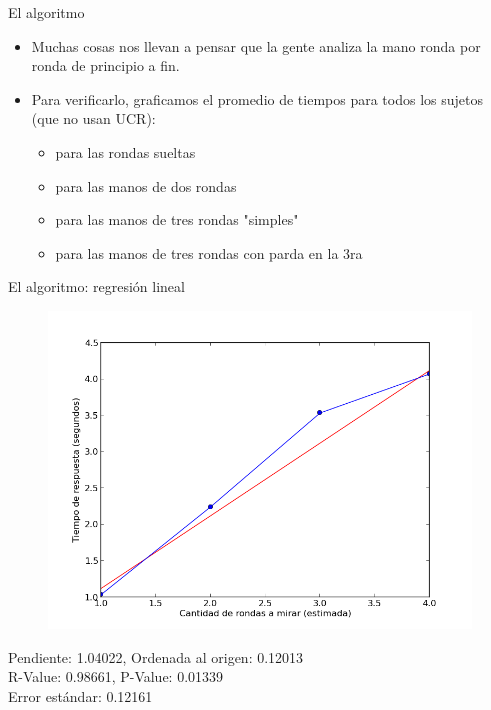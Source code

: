\documentclass{beamer}
\begin{document}
\begin{frame}{El algoritmo}
\begin{itemize}
\item Muchas cosas nos llevan a pensar que la gente analiza la mano ronda por ronda de principio a fin.
\item Para verificarlo, graficamos el promedio de tiempos para todos los sujetos (que no usan UCR):
	\begin{itemize}
    \item para las rondas sueltas
    \item para las manos de dos rondas
    \item para las manos de tres rondas "simples"
    \item para las manos de tres rondas con parda en la 3ra
    \end{itemize}
\end{itemize}
\end{frame}

\begin{frame}{El algoritmo: regresión lineal}
\begin{figure}
  	\includegraphics[width=0.7\linewidth]{graficos/lineal.png}
  \end{figure}
Pendiente: 			1.04022, 
Ordenada al origen: 0.12013 \\
R-Value: 			0.98661,  
P-Value:			0.01339 \\
Error estándar: 	0.12161
\end{frame}
\end{document}
